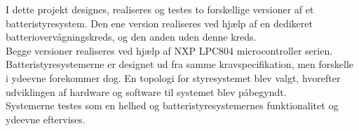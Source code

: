 I dette projekt designes, realiseres og testes to forskellige versioner af et batteristyresystem. Den ene version realiseres ved hjælp af en dedikeret batteriovervågningskreds, og den anden uden denne kreds.
\\

Begge versioner realiseres ved hjælp af NXP LPC804 microcontroller serien. Batteristyresystemerne er designet ud fra samme kravspecifikation, men forskelle i ydeevne forekommer dog. En topologi for styresystemet blev valgt, hvorefter udviklingen af hardware og software til systemet blev påbegyndt.
\\

Systemerne testes som en helhed og batteristyresystemernes funktionalitet og ydeevne eftervises.
